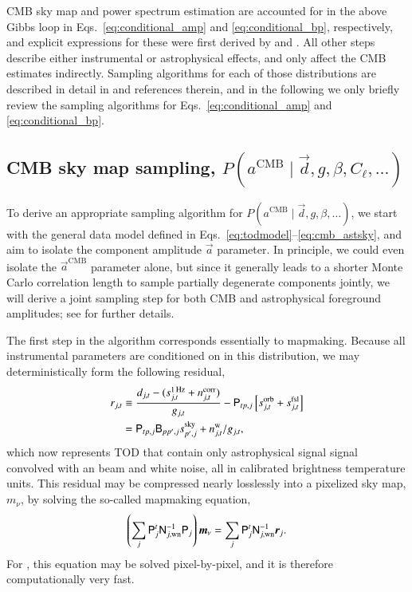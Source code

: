 \documentclass[twocolumn]{aa}
\renewcommand{\d}[0]{\vec{d}}
\renewcommand{\a}[0]{\vec{a}}
\newcommand{\m}[0]{\vec{m}}
\newcommand{\B}[0]{\tens{B}}
\newcommand{\N}[0]{\tens{N}}
\renewcommand{\r}[0]{\vec{r}}
\renewcommand{\P}[0]{\tens{P}}
\begin{document}
CMB sky map and power spectrum estimation are accounted for in the
above Gibbs loop in Eqs.~\eqref{eq:conditional_amp} and
\eqref{eq:conditional_bp}, respectively, and explicit expressions for
these were first derived by \citet{jewell2004} and
\citet{wandelt2004}. All other steps describe either instrumental or
astrophysical effects, and only affect the CMB estimates indirectly.
Sampling algorithms for each of those distributions are described in
detail in \citet{bp01} and references therein, and in the following we
only briefly review the sampling algorithms for
Eqs.~\eqref{eq:conditional_amp} and \eqref{eq:conditional_bp}.

\subsection{CMB sky map sampling, $P(a^{\mathrm{CMB}}\mid\d, g, \beta,
  C_{\ell},  \ldots)$}
\label{sec:amp_sampling}

To derive an appropriate sampling algorithm for
$P(a^{\mathrm{CMB}}\mid\d, g, \beta, \ldots)$, we start with the general
data model defined in Eqs.~\eqref{eq:todmodel}--\eqref{eq:cmb_astsky},
and aim to isolate the component amplitude $\a$ parameter. In
principle, we could even isolate the $\a^{\mathrm{CMB}}$ parameter
alone, but since it generally leads to a shorter Monte Carlo
correlation length to sample partially degenerate components jointly,
we will derive a joint sampling step for both CMB and astrophysical
foreground amplitudes; see \citet{bp13} for further details.

The first step in the algorithm corresponds essentially to
mapmaking. Because all instrumental parameters are conditioned on in
this distribution, we may deterministically form the following residual,
\begin{align}
  r_{j,t} &\equiv \frac{d_{j,t} - (s^{\mathrm{1\,Hz}}_{j,t} +
    n^{\mathrm{corr}}_{j,t})}{g_{j,t}} - \P_{tp,j}\left[s^{\mathrm{orb}}_{j,t} + s^{\mathrm{fsl}}_{j,t}\right] \\
  &= \P_{tp,j}\B_{pp',j} s^{\mathrm{sky}}_{p',j}  +  n^{\mathrm{w}}_{j,t}/g_{j,t},
  \label{eq:resmodel}
\end{align}
which now represents TOD that contain only astrophysical signal signal
convolved with an \citep[implicitly assumed azimuthally symmetric, see][for an in depth discussion]{bp01} beam and
white noise, all in calibrated brightness temperature units. This
residual may be compressed nearly losslessly into a pixelized sky map,
$m_{\nu}$, by solving the so-called mapmaking equation,
\begin{equation}
  \left(\sum_{j}\P_j^t\N^{-1}_{j,\mathrm{wn}}\P_j\right)\m_{\nu} =
  \sum_j \P_{j}^t\N_{j,\mathrm{wn}}^{-1}\r_{j}.
  \label{eq:mapmaking}
\end{equation}
For \Planck, this equation may be solved pixel-by-pixel, and it is
therefore computationally very fast.
\end{document}
